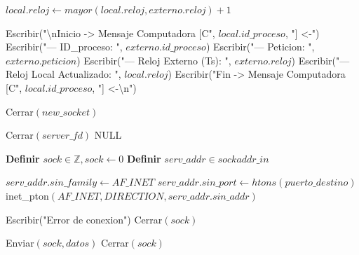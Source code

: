 \begin{tcolorbox}[colback=white, colframe=azul_unam, title=Pseudocódigo: cnx\_lamport.c (Conexión P2P), breakable]
\begin{algorithmic}[1]
        \Else {}
            \State $local.reloj \gets mayor(local.reloj, externo.reloj) + 1$ 
        \EndIf

        \State Escribir("\textbackslash nInicio -> Mensaje Computadora [C", $local.id\_proceso$, "] <-")
        \State Escribir("--- ID\_proceso: ", $externo.id\_proceso$)
        \State Escribir("--- Peticion: ", $externo.peticion$)
        \State Escribir("--- Reloj Externo (Ts): ", $externo.reloj$)
        \State Escribir("--- Reloj Local Actualizado: ", $local.reloj$)
        \State Escribir("Fin -> Mensaje Computadora [C", $local.id\_proceso$, "] <-\textbackslash n")

        \State Cerrar$(new\_socket)$

    \EndWhile

    \State Cerrar$(server\_fd)$
    \State \Return NULL

\EndProcedure

\vspace{0.3cm}



    \State \textbf{Definir} $sock \in \mathbb{Z}, sock \gets 0$
    \State \textbf{Definir} $serv\_addr \in sockaddr\_in$

        \State \Return
    \EndIf

    \State $serv\_addr.sin\_family \gets AF\_INET$
    \State $serv\_addr.sin\_port \gets htons(puerto\_destino)$
    \State inet\_pton$(AF\_INET, DIRECTION, serv\_addr.sin\_addr)$

        \State Escribir("Error de conexion")
        \State Cerrar$(sock)$
        \State \Return
    \EndIf

    \State Enviar$(sock, datos)$
    \State Cerrar$(sock)$

\EndProcedure

\end{algorithmic}
\end{tcolorbox}